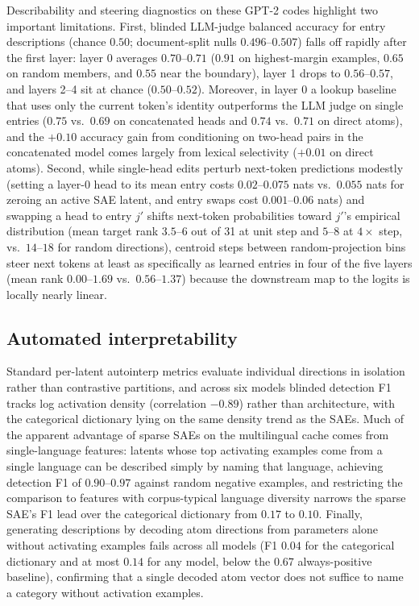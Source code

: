 Describability and steering diagnostics on these GPT-2 codes highlight
two important limitations. First, blinded LLM-judge balanced accuracy for
entry descriptions (chance $0.50$; document-split nulls $0.496$--$0.507$)
falls off rapidly after the first layer: layer 0 averages $0.70$--$0.71$
($0.91$ on highest-margin examples, $0.65$ on random members, and $0.55$
near the boundary), layer 1 drops to $0.56$--$0.57$, and layers 2--4 sit
at chance ($0.50$--$0.52$). Moreover, in layer 0 a lookup baseline that
uses only the current token's identity outperforms the LLM judge on
single entries ($0.75$ vs.\ $0.69$ on concatenated heads and $0.74$ vs.\
$0.71$ on direct atoms), and the $+0.10$ accuracy gain from conditioning
on two-head pairs in the concatenated model comes largely from lexical
selectivity ($+0.01$ on direct atoms). Second, while single-head edits
perturb next-token predictions modestly (setting a layer-0 head to its
mean entry costs $0.02$--$0.075$ nats vs.\ $0.055$ nats for zeroing an
active SAE latent, and entry swaps cost $0.001$--$0.06$ nats) and
swapping a head to entry $j'$ shifts next-token probabilities toward
$j'$'s empirical distribution (mean target rank $3.5$--$6$ out of 31 at
unit step and $5$--$8$ at $4\times$ step, vs.\ $14$--$18$ for random
directions), centroid steps between random-projection bins steer next
tokens at least as specifically as learned entries in four of the five
layers (mean rank $0.00$--$1.69$ vs.\ $0.56$--$1.37$) because the
downstream map to the logits is locally nearly linear.

\subsection{Automated interpretability}
\label{sec:prelim-autointerp}
Standard per-latent autointerp metrics evaluate individual directions in
isolation rather than contrastive partitions, and across six models
blinded detection F1 tracks log activation density (correlation $-0.89$)
rather than architecture, with the categorical dictionary lying on the
same density trend as the SAEs. Much of the apparent advantage of sparse SAEs
on the multilingual cache comes from single-language features: latents
whose top activating examples come from a single language can be
described simply by naming that language, achieving detection F1 of
$0.90$--$0.97$ against random negative examples, and restricting the
comparison to features with corpus-typical language diversity narrows the
sparse SAE's F1 lead over the categorical dictionary from $0.17$ to
$0.10$. Finally, generating descriptions by decoding atom directions from
parameters alone without activating examples fails across all models (F1
$0.04$ for the categorical dictionary and at most $0.14$ for any model,
below the $0.67$
always-positive baseline), confirming that a single decoded atom vector
does not suffice to name a category without activation examples.

